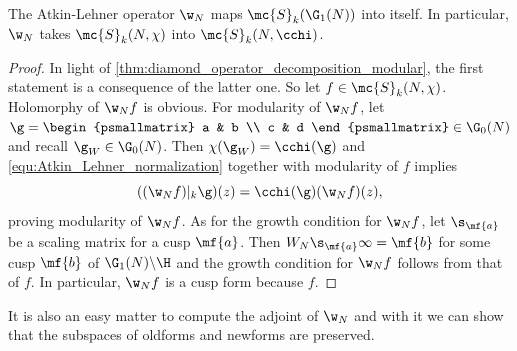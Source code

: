 \documentclass[12pt]{article}
\begin{document}
      \begin{proposition}
        The Atkin-Lehner operator \(\w_{N}\) maps \(\mc{S}_{k}(\G_{1}(N))\) into itself. In particular, \(\w_{N}\) takes \(\mc{S}_{k}(N,\chi)\) into \(\mc{S}_{k}(N,\cchi)\).
      \end{proposition}
      \begin{proof}
        In light of \cref{thm:diamond_operator_decomposition_modular}, the first statement is a consequence of the latter one. So let \(f \in \mc{S}_{k}(N,\chi)\). Holomorphy of \(\w_{N}f\) is obvious. For modularity of \(\w_{N}f\), let \(\g = \begin{psmallmatrix} a & b \\ c & d \end{psmallmatrix} \in \G_{0}(N)\) and recall \(\g_{W} \in \G_{0}(N)\). Then \(\chi(\g_{W}) = \cchi(\g)\) and \cref{equ:Atkin_Lehner_normalization} together with modularity of \(f\) implies
        \[
          ((\w_{N}f)|_{k}\g)(z) = \cchi(\g)(\w_{N}f)(z),
        \]
        proving modularity of \(\w_{N}f\). As for the growth condition for \(\w_{N}f\), let \(\s_{\mf{a}}\) be a scaling matrix for a cusp \(\mf{a}\). Then \(W_{N}\s_{\mf{a}}\infty = \mf{b}\) for some cusp \(\mf{b}\) of \(\G_{1}(N)\backslash\H\) and the growth condition for \(\w_{N}f\) follows from that of \(f\). In particular, \(\w_{N}f\) is a cusp form because \(f\).
      \end{proof}

      It is also an easy matter to compute the adjoint of \(\w_{N}\) and with it we can show that the subspaces of oldforms and newforms are preserved.
\end{document}
